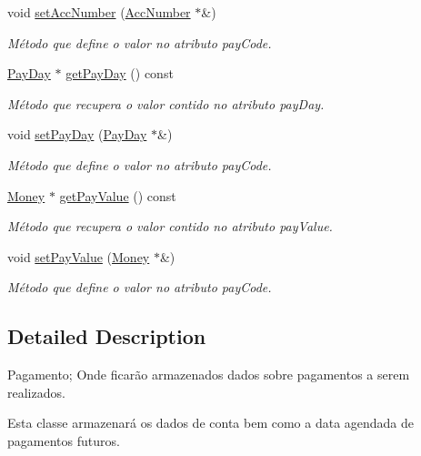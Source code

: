 \begin{DoxyCompactItemize}
void \hyperlink{classPayment_a296c7bac32e094e6fd6176e5fea5dead}{set\-Acc\-Number} (\hyperlink{classAccNumber}{Acc\-Number} $\ast$\&)
\begin{DoxyCompactList}\small\item\em Método que define o valor no atributo pay\-Code. \end{DoxyCompactList}\item 
\hyperlink{classPayDay}{Pay\-Day} $\ast$ \hyperlink{classPayment_af9338882685e12f00ae665a45ed32545}{get\-Pay\-Day} () const 
\begin{DoxyCompactList}\small\item\em Método que recupera o valor contido no atributo pay\-Day. \end{DoxyCompactList}\item 
void \hyperlink{classPayment_ab38a43aec480364b87fb4b936e3f939d}{set\-Pay\-Day} (\hyperlink{classPayDay}{Pay\-Day} $\ast$\&)
\begin{DoxyCompactList}\small\item\em Método que define o valor no atributo pay\-Code. \end{DoxyCompactList}\item 
\hyperlink{classMoney}{Money} $\ast$ \hyperlink{classPayment_a4a68506667eb91d99d1bb67a1f3bec2a}{get\-Pay\-Value} () const 
\begin{DoxyCompactList}\small\item\em Método que recupera o valor contido no atributo pay\-Value. \end{DoxyCompactList}\item 
void \hyperlink{classPayment_aa3c69f9962d25ed056ee2a673240e1e0}{set\-Pay\-Value} (\hyperlink{classMoney}{Money} $\ast$\&)
\begin{DoxyCompactList}\small\item\em Método que define o valor no atributo pay\-Code. \end{DoxyCompactList}\end{DoxyCompactItemize}


\subsection{Detailed Description}
Pagamento; Onde ficarão armazenados dados sobre pagamentos a serem realizados. 

Esta classe armazenará os dados de conta bem como a data agendada de pagamentos futuros. 

